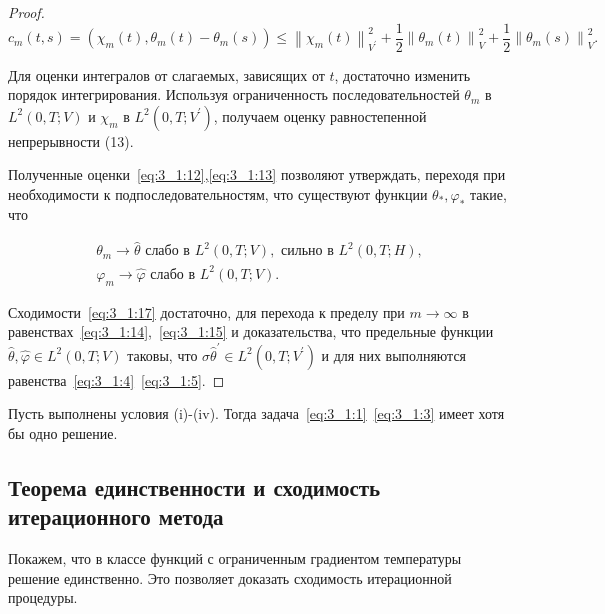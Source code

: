 \begin{proof}
\[
    c_{m}(t, s)=\left(\chi_{m}(t), \theta_{m}(t)-\theta_{m}(s)\right)
    \leq\left\|\chi_{m}(t)\right\|_{V^{\prime}}^{2}
    +\frac{1}{2}\left\|\theta_{m}(t)\right\|_{V}^{2}
    +\frac{1}{2}\left\|\theta_{m}(s)\right\|_{V}^{2}.
\]

Для оценки интегралов от слагаемых, зависящих от $t$,
достаточно изменить порядок интегрирования.
Используя ограниченность последовательностей
$\theta_{m}$ в $L^{2}(0, T ; V)$ и $\chi_{m}$ в $L^{2}\left(0, T ; V^{\prime}\right)$,
получаем оценку равностепенной непрерывности (13).

Полученные оценки~\eqref{eq:3_1:12},\eqref{eq:3_1:13}
позволяют утверждать,
переходя при необходимости к подпоследовательностям,
что существуют функции $\theta_{*}, \varphi_{*}$ такие, что

\begin{equation}
    \label{eq:3_1:17}
    \begin{aligned}
        \theta_{m} \rightarrow \widehat{\theta}
        \text { слабо в } L^{2}(0, T ; V),
        \text { сильно в } L^{2}(0, T ; H), \\
        \varphi_{m} \rightarrow \widehat{\varphi}
        \text { слабо в } L^{2}(0, T ; V).
    \end{aligned}
\end{equation}

Сходимости~\eqref{eq:3_1:17} достаточно, для перехода к пределу
при $m \rightarrow \infty$
в равенствах~\eqref{eq:3_1:14},~\eqref{eq:3_1:15}
и доказательства, что предельные функции $\widehat{\theta},
\widehat{\varphi } \in L^{2}(0, T ; V)$ таковы,
что $\sigma \widehat{\theta}^{\prime} \in L^{2}\left(0, T ; V^{ \prime}\right)$
и для них выполняются равенства~\eqref{eq:3_1:4}~\eqref{eq:3_1:5}.
\end{proof}

\begin{theorem}
    \label{th:3_1:1}
Пусть выполнены условия (i)-(iv).
Тогда задача~\eqref{eq:3_1:1}~\eqref{eq:3_1:3} имеет хотя бы одно решение.
\end{theorem}

\subsection{Теорема единственности и сходимость итерационного метода}
\label{subsec:ch3/sec1/uniqeness_convergense}
Покажем, что в классе функций с ограниченным градиентом температуры решение единственно.
Это позволяет доказать сходимость итерационной процедуры.

